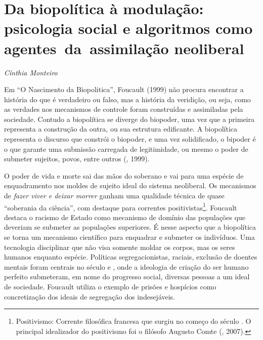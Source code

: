 \chapter*{Da biopolítica à modulação:\\ psicologia social e algoritmos como agentes~da~assimilação neoliberal}

\begin{flushright}
\emph{Cínthia Monteiro}
\end{flushright}

Em ``O Nascimento da Biopolitica'', Foucault (1999) não procura
encontrar a história do que é verdadeiro ou falso, mas a história da
veridição, ou seja, como as verdades nos mecanismos de controle foram
construídas e assimiladas pela sociedade. Contudo a biopolítica se
diverge do biopoder, uma vez que a primeira representa a construção da
outra, ou sua estrutura edificante. A biopolítica representa o discurso
que constrói o biopoder, e uma vez solidificado, o bipoder é o que
garante uma submissão carregada de legitimidade, ou mesmo o poder de
submeter sujeitos, povos, entre outros (, 1999).

O poder de vida e morte sai das mãos do soberano e vai para uma espécie
de enquadramento nos moldes de sujeito ideal do sistema neoliberal. Os
mecanismos de \emph{fazer viver e deixar morrer} ganham uma qualidade
técnica de quase ``soberania da ciência'', com destaque para correntes
positivistas\footnote{Positivismo: Corrente filosófica francesa que
  surgiu no começo do século . O principal idealizador do positivismo
  foi o filósofo Augusto Comte (, 2007).}. Foucault destaca o
racismo de Estado como mecanismo de domínio das populações que deveriam
se submeter as populações superiores. É nesse aspecto que a biopolítica
se torna um mecanismo científico para enquadrar e submeter os
indivíduos. Uma tecnologia disciplinar que não visa somente moldar os
corpos, mas os seres humanos enquanto espécie. Políticas
segregacionistas, raciais, exclusão de doentes mentais foram centrais no
século  e , onde a ideologia de criação do ser humano perfeito
submeteram, em nome do progresso social, diversas pessoas a um
ideal de sociedade. Foucault utiliza o exemplo de prisões e hospícios
como concretização dos ideais de segregação dos indesejáveis.

